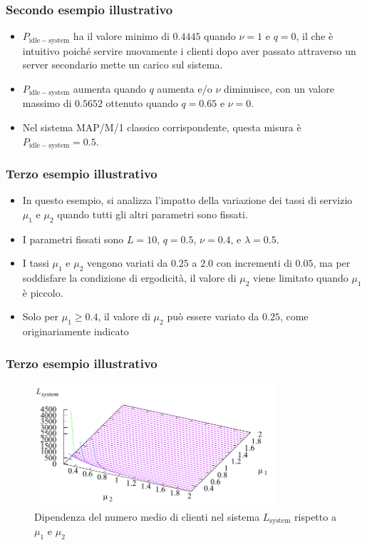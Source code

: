 \documentclass{beamer}
\begin{document}
\begin{frame}
    \frametitle{Secondo esempio illustrativo}
    \begin{itemize}
        \item $P_\mathrm{idle-system}$ ha il valore minimo di $0.4445$ quando $\nu=1$ e $q=0$, il che è intuitivo poiché servire nuovamente i clienti dopo aver passato attraverso un server secondario mette un carico sul sistema.
        \item $P_\mathrm{idle-system}$ aumenta quando $q$ aumenta e/o $\nu$ diminuisce, con un valore massimo di $0.5652$ ottenuto quando $q=0.65$ e $\nu=0$.
        \item Nel sistema MAP/M/1 classico corrispondente, questa misura è $P_\mathrm{idle-system}=0.5$.
    \end{itemize}
\end{frame}


\begin{frame}
    \frametitle{Terzo esempio illustrativo}
    \begin{itemize}
        \item In questo esempio, si analizza l'impatto della variazione dei tassi di servizio $\mu_1$ e $\mu_2$ quando tutti gli altri parametri sono fissati.
        \item I parametri fissati sono $L=10$, $q=0.5$, $\nu=0.4$, e $\lambda=0.5$.
        \item I tassi $\mu_1$ e $\mu_2$ vengono variati da $0.25$ a $2.0$ con incrementi di $0.05$, ma per soddisfare la condizione di ergodicità, il valore di $\mu_2$ viene limitato quando $\mu_1$ è piccolo.
        \item Solo per $\mu_1\geq0.4$, il valore di $\mu_2$ può essere variato da $0.25$, come originariamente indicato
    \end{itemize}
\end{frame}


\begin{frame}
    \frametitle{Terzo esempio illustrativo}
    \begin{figure}[h]
        \centering
        \includegraphics[width=0.8\textwidth]{9LBRzWR.png}
        \caption{Dipendenza del numero medio di clienti nel sistema $L_{\mathrm{system}}$ rispetto a $\mu_1$ e $\mu_2$}
    \end{figure}
\end{frame}
\end{document}

